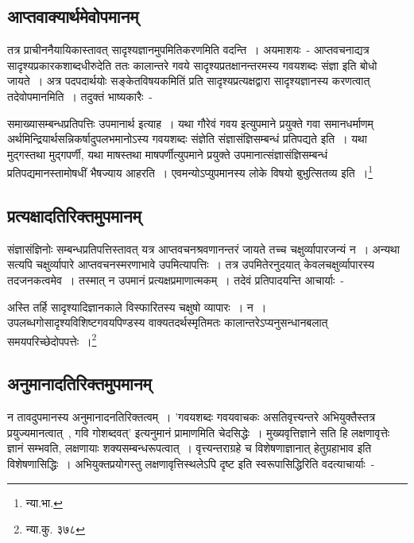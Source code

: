 		\subsection{आप्तवाक्यार्थमेवोपमानम्}

		तत्र प्राचीननैयायिकास्तावत् सादृश्यज्ञानमुपमितिकरणमिति वदन्ति~। अयमाशयः~- आप्तवचनाद्यत्र सादृश्यप्रकारकशाब्दधीरुदेति ततः कालान्तरे गवये सादृश्यप्रतक्षानन्तरमस्य गवयशब्दः संज्ञा इति बोधो जायते~। अत्र पदपदार्थयोः सङ्केतविषयकमितिं प्रति सादृश्यप्रत्यक्षद्वारा सादृश्यज्ञानस्य करणत्वात् तदेवोपमानमिति~। तदुक्तं  भाष्यकारैः~-

		{\fontsize{11.7}{0}\selectfont\s समाख्यासम्बन्धप्रतिपत्तिः उपमानार्थ इत्याह~। यथा गौरेवं गवय इत्युपमाने प्रयुक्ते गवा समानधर्माणम् अर्थमिन्द्रियार्थसन्निकर्षादुपलभमानोऽस्य गवयशब्दः संज्ञेति संज्ञासंज्ञिसम्बन्धं प्रतिपद्यते इति~। यथा मुद्गस्तथा मुद्गपर्णी, यथा माषस्तथा माषपर्णीत्युपमाने प्रयुक्ते उपमानात्संज्ञासंज्ञिसम्बन्धं प्रतिपद्यमानस्तामोषधीं भैषज्याय आहरति~। एवमन्योऽप्युपमानस्य लोके विषयो बुभुत्सितव्य इति~।\footnote{न्या.भा.}}

		\subsection{प्रत्यक्षादतिरिक्तमुपमानम्}

		संज्ञासंज्ञिनोः सम्बन्धप्रतिपत्तिस्तावत् यत्र आप्तवचनश्रवणानन्तरं जायते तच्च चक्षुर्व्यापारजन्यं न~। अन्यथा सत्यपि चक्षुर्व्यापारे आप्तवचनस्मरणाभावे उपमित्यापत्तिः~। तत्र उपमितेरनुदयात् केवलचक्षुर्व्यापारस्य तदजनकत्वमेव~। तस्मात् न उपमानं प्रत्यक्षप्रमाणात्मकम्~। तदेवं प्रतिपादयन्ति आचार्याः~-

		{\fontsize{11.7}{0}\selectfont\s अस्ति तर्हि सादृश्यादिज्ञानकाले विस्फारितस्य चक्षुषो व्यापारः~। न~। उपलब्धगोसादृश्यविशिष्टगवयपिण्डस्य वाक्यतदर्थस्मृतिमतः कालान्तरेऽप्यनुसन्धानबलात् समयपरिच्छेदोपपत्तेः~।\footnote{न्या.कु. ३७८}}

		\subsection{अनुमानादतिरिक्तमुपमानम्}

		न तावदुपमानस्य अनुमानादनतिरिक्तत्वम्~। 'गवयशब्दः गवयवाचकः असतिवृत्त्यन्तरे अभियुक्तैस्तत्र प्रयुज्यमानत्वात्~, गवि गोशब्दवत्' इत्यनुमानं प्रामाणमिति चेदसिद्धेः~। मुख्यवृत्तिज्ञाने सति हि लक्षणावृत्तेः ज्ञानं सम्भवति, लक्षणायाः शक्यसम्बन्धरूपत्वात्~। वृत्त्यन्तराग्रहे च विशेषणाज्ञानात् हेतुग्रहाभाव इति विशेषणासिद्धिः~। अभियुक्तप्रयोगस्तु लक्षणावृत्तिस्थलेऽपि दृष्ट इति स्वरूपासिद्धिरिति वदत्याचार्याः~- 

